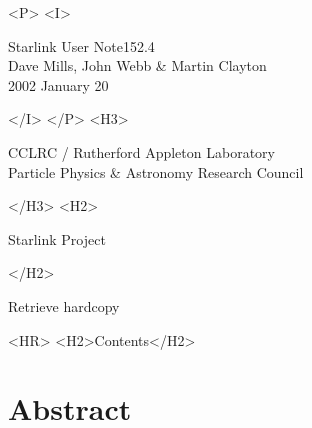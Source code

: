 \documentclass[11pt,twoside]{article}
\newcommand{\stardoccategory}  {Starlink User Note}
\newcommand{\stardocsource}    {sun\stardocnumber}
\newcommand{\stardocnumber}    {152.4}
\newcommand{\stardocauthors}   {Dave Mills, John Webb \& Martin Clayton}
\newcommand{\stardocdate}      {2002 January 20}
\newcommand{\htmladdnormallink}[2]{#1}
\newcommand{\htmladdimg}[1]{}
\newcommand{\htmlref}[2]{#1}
\newcommand{\htmladdtonavigation}[1]{}
\newcommand{\xlabel}[1]{}
\newcommand{\latexonlytoc}[0]{\tableofcontents}
\begin{document}
\begin{htmlonly}
   \begin{rawhtml} <P> <I> \end{rawhtml}
   \stardoccategory \stardocnumber \\
   \stardocauthors \\
   \stardocdate
   \begin{rawhtml} </I> </P> <H3> \end{rawhtml}
      \htmladdnormallink{CCLRC}{http://www.cclrc.ac.uk} /
      {Rutherford Appleton Laboratory}\\
      \htmladdnormallink{Particle Physics \& Astronomy Research Council}
                        {http://www.pparc.ac.uk} \\
   \begin{rawhtml} </H3> <H2> \end{rawhtml}
      \htmladdnormallink{Starlink Project}{http://www.starlink.rl.ac.uk/}
   \begin{rawhtml} </H2> \end{rawhtml}
   \htmladdnormallink{\htmladdimg{source.gif} Retrieve hardcopy}
      {http://www.starlink.rl.ac.uk/cgi-bin/hcserver?\stardocsource}\\

  \label{stardoccontents}
  \begin{rawhtml}
    <HR>
    <H2>Contents</H2>
  \end{rawhtml}
  \renewcommand{\latexonlytoc}[0]{}
  \htmladdtonavigation{\htmlref{\htmladdimg{contents_motif.gif}}
        {stardoccontents}}

  \section{\xlabel{abstract}Abstract}
\end{htmlonly}
\end{document}
